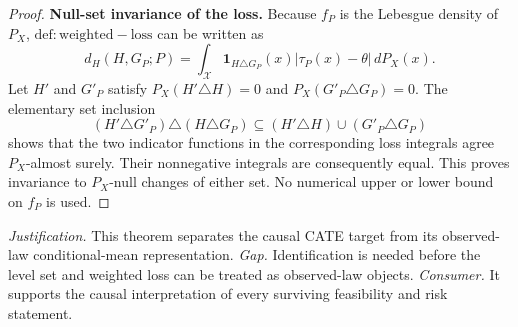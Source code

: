 \documentclass{article}
\begin{document}
\begin{proof}
\textbf{Null-set invariance of the loss.} Because \(f_P\) is the Lebesgue density of \(P_X\), \(\mathrm{def:weighted-loss}\) can be written as
\[
 d_H(H,G_P;P)
 =\int_{\mathcal X}\mathbf 1_{H\triangle G_P}(x)
       |\tau_P(x)-\theta|\,dP_X(x).
\]
Let \(H'\) and \(G'_P\) satisfy \(P_X(H'\triangle H)=0\) and \(P_X(G'_P\triangle G_P)=0\). The elementary set inclusion
\[
 (H'\triangle G'_P)\triangle(H\triangle G_P)
 \subseteq (H'\triangle H)\cup(G'_P\triangle G_P)
\]
shows that the two indicator functions in the corresponding loss integrals agree \(P_X\)-almost surely. Their nonnegative integrals are consequently equal. This proves invariance to \(P_X\)-null changes of either set. No numerical upper or lower bound on \(f_P\) is used.
\end{proof}
\par\smallskip\noindent \textit{Justification.} This theorem separates the causal CATE target from its observed-law conditional-mean representation. \textit{Gap.} Identification is needed before the level set and weighted loss can be treated as observed-law objects. \textit{Consumer.} It supports the causal interpretation of every surviving feasibility and risk statement.
\end{document}
